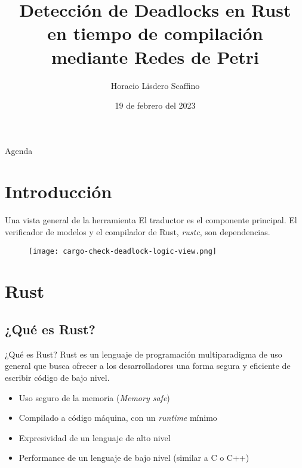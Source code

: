 \documentclass{beamer}
\title[Detección de Deadlocks en Rust]{Detección de Deadlocks en Rust \\ en tiempo de compilación \\ mediante Redes de Petri}
\author{Horacio Lisdero Scaffino}
\institute[FIUBA]{Facultad de Ingeniería\\Universidad de Buenos Aires}
\date{19 de febrero del 2023}
\begin{document}
\begin{frame}
  \titlepage
\end{frame}

\logo{}

\begin{frame}{Agenda}
  \tableofcontents
\end{frame}

\section{Introducción}

\begin{frame}{Una vista general de la herramienta}
  El traductor es el componente principal.
  El verificador de modelos y el compilador de Rust, \emph{rustc}, son dependencias.

  \begin{figure}
    \centering
    \texttt{[image: cargo-check-deadlock-logic-view.png]}
  \end{figure}
\end{frame}

\section{Rust}

\subsection{¿Qué es Rust?}

\begin{frame}{¿Qué es Rust?}
  Rust es un lenguaje de programación multiparadigma de uso general que
  busca ofrecer a los desarrolladores una forma segura y eficiente de escribir código de bajo nivel.
  
  \pause
  \vfill

  \begin{itemize}
    \item Uso seguro de la memoria (\emph{Memory safe})
    \item Compilado a código máquina, con un \emph{runtime} mínimo
    \item Expresividad de un lenguaje de alto nivel
    \item Performance de un lenguaje de bajo nivel (similar a C o C++)
  \end{itemize}
\end{frame}
\end{document}
